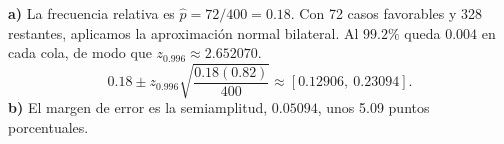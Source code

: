 \textbf{a)} La frecuencia relativa es $\hat p=72/400=0.18$.
Con 72 casos favorables y 328 restantes, aplicamos la
aproximación normal bilateral. Al $99.2\%$ queda $0.004$
en cada cola, de modo que $z_{0.996}\approx2.652070$.
\[
0.18\pm z_{0.996}\sqrt{\frac{0.18(0.82)}{400}}
\approx\boxed{[0.12906,\ 0.23094]}.
\]
\textbf{b)} El margen de error es la semiamplitud,
$\boxed{0.05094}$, unos 5.09 puntos porcentuales.
